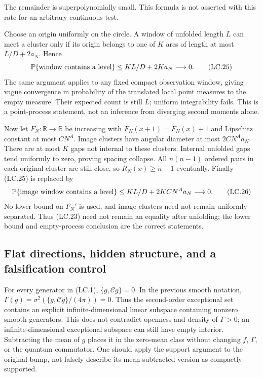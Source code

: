 \] The remainder is superpolynomially small. This formula is not asserted with this rate for an arbitrary continuous test.

Choose an origin uniformly on the circle. A window of unfolded length \(L\) can meet a cluster only if its origin belongs to one of \(K\) arcs of length at most \(L/D+2a_N\). Hence \[
 \mathbb P\{\hbox{window contains a level}\}
       \leq KL/D+2Ka_N\longrightarrow0.                     \tag{LC.25}
\] The same argument applies to any fixed compact observation window, giving vague convergence in probability of the translated local point measures to the empty measure. Their expected count is still \(L\); uniform integrability fails. This is a point-process statement, not an inference from diverging second moments alone.

Now let \(F_N:\mathbb R\to\mathbb R\) be increasing with \(F_N(x+1)=F_N(x)+1\) and Lipschitz constant at most \(C N^A\). Image clusters have angular diameter at most \(2CN^Aa_N\). There are at most \(K\) gaps not internal to these clusters. Internal unfolded gaps tend uniformly to zero, proving spacing collapse. All \(n(n-1)\) ordered pairs in each original cluster are still close, so \(R_N(x)\geq n-1\) eventually. Finally (LC.25) is replaced by \[
 \mathbb P\{\hbox{image window contains a level}\}
       \leq KL/D+2KCN^Aa_N\longrightarrow0.                 \tag{LC.26}
\] No lower bound on \(F_N'\) is used, and image clusters need not remain uniformly separated. Thus (LC.23) need not remain an equality after unfolding; the lower bound and empty-process conclusion are the correct statements.

\subsection{Flat directions, hidden structure, and a falsification control}\label{locality:flat-directions-hidden-structure-and-a-falsification-control}

For every generator in (LC.1), \(\{g,\mathcal Cg\}=0\). In the previous smooth notation, \(\Gamma(g)=\sigma^2(\{g,\mathcal Cg\}/(4\pi))=0\). Thus the second-order exceptional set contains an explicit infinite-dimensional linear subspace containing nonzero smooth generators. This does not contradict openness and density of \(\Gamma>0\); an infinite-dimensional exceptional subspace can still have empty interior. Subtracting the mean of \(g\) places it in the zero-mean class without changing \(f\), \(\Gamma\), or the quantum commutator. One should apply the support argument to the original bump, not falsely describe its mean-subtracted version as compactly supported.

